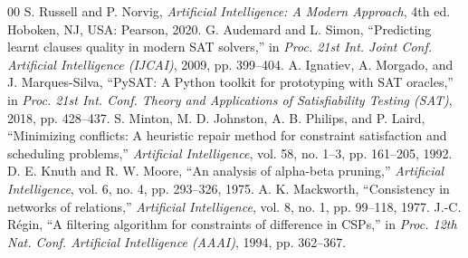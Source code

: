 \documentclass[conference]{IEEEtran}
\begin{document}
\begin{thebibliography}{00}
 S. Russell and P. Norvig, \textit{Artificial Intelligence: A Modern Approach}, 4th ed. Hoboken, NJ, USA: Pearson, 2020.
 G. Audemard and L. Simon, ``Predicting learnt clauses quality in modern SAT solvers,'' in \textit{Proc. 21st Int. Joint Conf. Artificial Intelligence (IJCAI)}, 2009, pp. 399--404.
 A. Ignatiev, A. Morgado, and J. Marques-Silva, ``PySAT: A Python toolkit for prototyping with SAT oracles,'' in \textit{Proc. 21st Int. Conf. Theory and Applications of Satisfiability Testing (SAT)}, 2018, pp. 428--437.
 S. Minton, M. D. Johnston, A. B. Philips, and P. Laird, ``Minimizing conflicts: A heuristic repair method for constraint satisfaction and scheduling problems,'' \textit{Artificial Intelligence}, vol. 58, no. 1--3, pp. 161--205, 1992.
 D. E. Knuth and R. W. Moore, ``An analysis of alpha-beta pruning,'' \textit{Artificial Intelligence}, vol. 6, no. 4, pp. 293--326, 1975.
 A. K. Mackworth, ``Consistency in networks of relations,'' \textit{Artificial Intelligence}, vol. 8, no. 1, pp. 99--118, 1977.
 J.-C. R\'egin, ``A filtering algorithm for constraints of difference in CSPs,'' in \textit{Proc. 12th Nat. Conf. Artificial Intelligence (AAAI)}, 1994, pp. 362--367.
\end{thebibliography}
\end{document}
